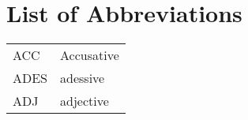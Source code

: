 \chapter*{List of Abbreviations}

\begin{table}[H]
\renewcommand*{\arraystretch}{1.4}
	\begin{tabu}{X[2,l]X[4,l]} 
	ACC & Accusative\\
	ADES & adessive\\
	ADJ & adjective\\
	\end{tabu}
\end{table}
